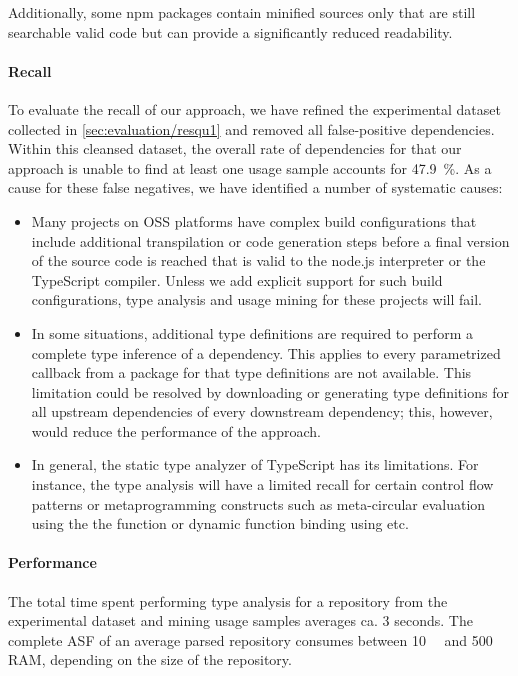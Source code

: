 Additionally, some npm packages contain minified sources only that are still searchable valid code but can provide a significantly reduced readability.

\paragraph{Recall}
\label{sec:evaluation/resqu2/recall}

To evaluate the recall of our approach, we have refined the experimental dataset collected in \cref{sec:evaluation/resqu1} and removed all false-positive dependencies.
Within this cleansed dataset, the overall rate of dependencies for that our approach is unable to find at least one usage sample accounts for \SI{47.9}{\percent}.
As a cause for these false negatives, we have identified a number of systematic causes:

\begin{itemize}
	\item Many projects on OSS platforms have complex build configurations that include additional transpilation or code generation steps before a final version of the source code is reached that is valid to the node.js interpreter or the TypeScript compiler.
		Unless we add explicit support for such build configurations, type analysis and usage mining for these projects will fail.
	\item In some situations, additional type definitions are required to perform a complete type inference of a dependency.
		This applies to every parametrized callback from a package for that type definitions are not available.
		This limitation could be resolved by downloading or generating type definitions for all upstream dependencies of every downstream dependency; this, however, would reduce the performance of the approach.
	\item In general, the static type analyzer of TypeScript has its limitations.
		For instance, the type analysis will have a limited recall for certain control flow patterns or metaprogramming constructs such as meta-circular evaluation using the the  function or dynamic function binding using  etc.
\end{itemize}

\paragraph{Performance}
\label{sec:evaluation/resqu2/performance}

The total time spent performing type analysis for a repository from the experimental dataset and mining usage samples averages ca. \num{3} seconds.
The complete ASF of an average parsed repository consumes between \SI{10}{\mega\byte} and \SI{500}{\mega\byte} RAM, depending on the size of the repository.


